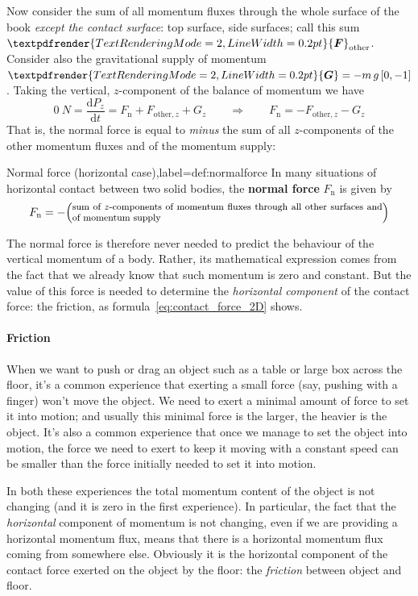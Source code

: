 \documentclass[a4paper,12pt,%
onecolumn,oneside,%
british%
]{memoir}
\renewcommand*{\bm}[1]{\textpdfrender{TextRenderingMode=2,LineWidth=0.2pt}{\boldsymbol{#1}}}
\newcommand*{\di}{\mathrm{d}}%
\renewcommand*{\|}[1][]{\nonscript\:#1\vert\nonscript\:\mathopen{}}
\newcommand*{\yM}{m}%
\newcommand*{\yF}{\bm{F}}
\newcommand*{\yFn}{F_{\text{n}}}
\newcommand*{\yFr}{\yF_{\text{other}}}
\newcommand*{\yFrz}{F_{\text{other},z}}
\newcommand*{\yG}{\bm{G}}
\begin{document}
Now consider the sum of all momentum fluxes through the whole surface of the book \emph{except the contact surface}: top surface, side surfaces; call this sum $\yFr$. Consider also the gravitational supply of momentum $\yG=-\yM\,g\,[0,-1]$. Taking the vertical, $z$-component of the balance of momentum we have
\begin{equation*}
  \qty{0}{N} =
  \frac{\di P_{z}}{\di t}
  = \yFn + \yFrz + G_{z}
\qquad  \Longrightarrow\qquad
  \yFn = - \yFrz - G_{z}
\end{equation*}
That is, the normal force is equal to \emph{minus} the sum of all $z$-components of the other momentum fluxes and of the momentum supply:
\begin{definition}{Normal force (horizontal case),label={def:normalforce}}
  In many situations of horizontal contact between two solid bodies, the \textbf{normal force} $\yFn$ is given by
  \begin{equation*}
    \yFn = -\Bigl(\parbox{0.8\linewidth}{\footnotesize sum of $z$-components of momentum fluxes through all other surfaces and of momentum supply}\Bigr)
  \end{equation*}
\end{definition}

The normal force is therefore never needed to predict the behaviour of the vertical momentum of a body. Rather, its mathematical expression comes from the fact that we already know that such momentum is zero and constant. But the value of this force is needed to determine the \emph{horizontal component} of the contact force: the friction, as formula~\eqref{eq:contact_force_2D} shows.

\paragraph{Friction}

When we want to push or drag an object such as a table or large box across the floor, it's a common experience that exerting a small force (say, pushing with a finger) won't move the object. We need to exert a minimal amount of force to set it into motion; and usually this minimal force is the larger, the heavier is the object. It's also a common experience that once we manage to set the object into motion, the force we need to exert to keep it moving with a constant speed can be smaller than the force initially needed to set it into motion.

In both these experiences the total momentum content of the object is not changing (and it is zero in the first experience). In particular, the fact that the \emph{horizontal} component of momentum is not changing, even if we are providing a horizontal momentum flux, means that there is a horizontal momentum flux coming from somewhere else. Obviously it is the horizontal component of the contact force exerted on the object by the floor: the \emph{friction} between object and floor.
\end{document}
